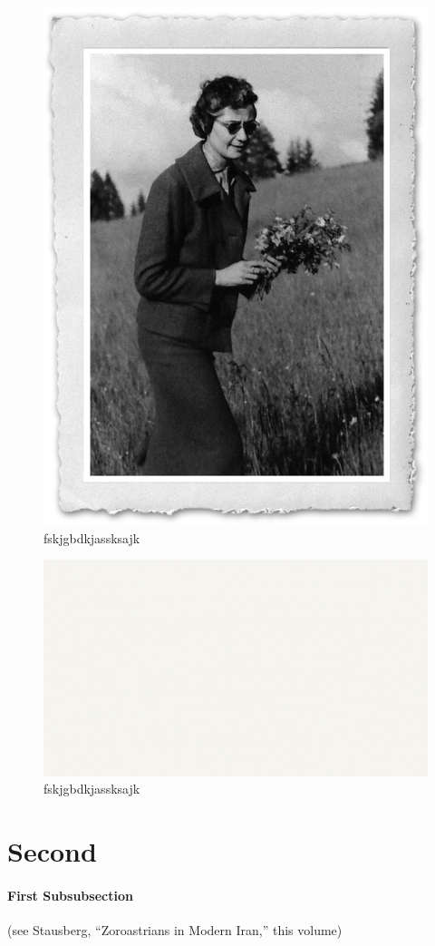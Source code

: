 \documentclass{report}
\begin{document}
\begin{figure}[h]
\includegraphics[width=0.5\linewidth]{Figure1.jpg}
\caption{fskjgbdkjassksajk}
\label{fig1}
\end{figure}
\begin{figure}[h]
\includegraphics[width=0.3\linewidth]{New Folder/Picture2.png}
\caption{fskjgbdkjassksajk}
\end{figure}

\chapter{Second} \label{sss1}

\subsubsection{First Subsubsection}
(see Stausberg, “Zoroastrians in Modern Iran,” this volume)
\end{document}
